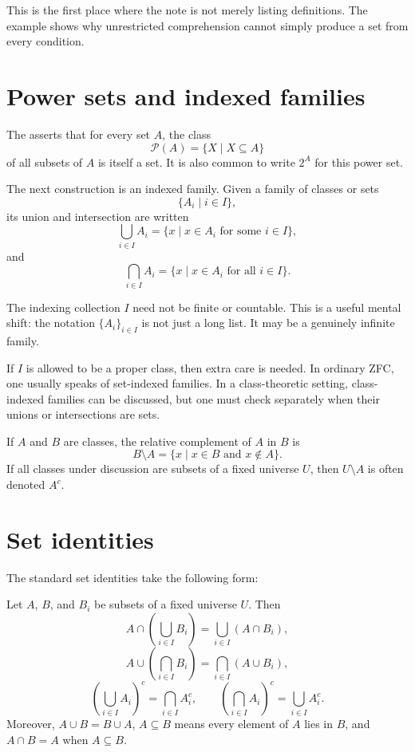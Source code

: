 This is the first place where the note is not merely listing definitions.  The example shows why unrestricted comprehension cannot simply produce a set from every condition.

\section{Power sets and indexed families}

\begin{definition}
The  asserts that for every set \(A\), the class
\[
  \mathcal P(A)=\{X \mid X\subseteq A\}
\]
of all subsets of \(A\) is itself a set.  It is also common to write \(2^A\) for this power set.
\end{definition}

The next construction is an indexed family.  Given a family of classes or sets
\[
  \{A_i \mid i\in I\},
\]
its union and intersection are written
\[
  \bigcup_{i\in I} A_i = \{x \mid x\in A_i \text{ for some } i\in I\},
\]
and
\[
  \bigcap_{i\in I} A_i = \{x \mid x\in A_i \text{ for all } i\in I\}.
\]

\begin{remark}
The indexing collection \(I\) need not be finite or countable.  This is a useful mental shift: the notation \(\{A_i\}_{i\in I}\) is not just a long list.  It may be a genuinely infinite family.
\end{remark}

\begin{caution}
If \(I\) is allowed to be a proper class, then extra care is needed.  In ordinary ZFC, one usually speaks of set-indexed families.  In a class-theoretic setting, class-indexed families can be discussed, but one must check separately when their unions or intersections are sets.
\end{caution}

If \(A\) and \(B\) are classes, the relative complement of \(A\) in \(B\) is
\[
  B\setminus A = \{x\mid x\in B \text{ and } x\notin A\}.
\]
If all classes under discussion are subsets of a fixed universe \(U\), then \(U\setminus A\) is often denoted \(A^c\).

\section{Set identities}

The standard set identities take the following form:
\begin{proposition}
Let \(A\), \(B\), and \(B_i\) be subsets of a fixed universe \(U\).  Then
\[
 A\cap\left(\bigcup_{i\in I} B_i\right)
 = \bigcup_{i\in I}(A\cap B_i),
\]
\[
 A\cup\left(\bigcap_{i\in I} B_i\right)
 = \bigcap_{i\in I}(A\cup B_i),
\]
\[
 \left(\bigcup_{i\in I} A_i\right)^c
 = \bigcap_{i\in I} A_i^c,
 \qquad
 \left(\bigcap_{i\in I} A_i\right)^c
 = \bigcup_{i\in I} A_i^c.
\]
Moreover, \(A\cup B=B\cup A\), \(A\subseteq B\) means every element of \(A\) lies in \(B\), and \(A\cap B=A\) when \(A\subseteq B\).
\end{proposition}

